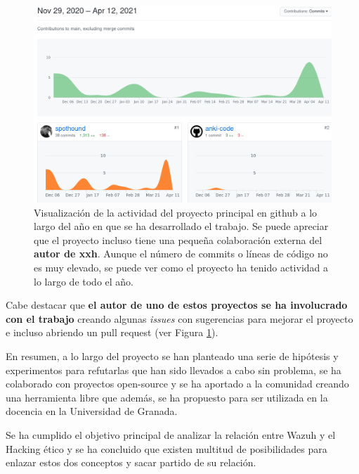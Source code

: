\begin{figure}[!hbt]
  \centering
  \includegraphics[width=\textwidth]{imagenes/github_activity.png}
  \caption{Visualización de la actividad del proyecto principal en github a lo largo del año en que se ha desarrollado el trabajo. Se puede apreciar que el proyecto incluso tiene una pequeña colaboración externa del \textbf{autor de xxh}. Aunque el número de commits o líneas de código no es muy elevado, se puede ver como el proyecto ha tenido actividad a lo largo de todo el año.}
  \label{githubactivity}
\end{figure}


Cabe destacar que \textbf{el autor de uno de estos proyectos se ha involucrado con el trabajo} creando algunas \textit{issues} con sugerencias para mejorar el proyecto e incluso abriendo un pull request (ver Figura \ref{githubactivity}).

En resumen, a lo largo del proyecto se han planteado una serie de hipótesis y experimentos para refutarlas que han sido llevados a cabo sin problema, se ha colaborado con proyectos open-source y se ha aportado a la comunidad creando una herramienta libre que además, se ha propuesto para ser utilizada en la docencia en la Universidad de Granada. 

Se ha cumplido el objetivo principal de analizar la relación entre Wazuh y el Hacking ético y se ha concluido que existen multitud de posibilidades para enlazar estos dos conceptos y sacar partido de su relación.

